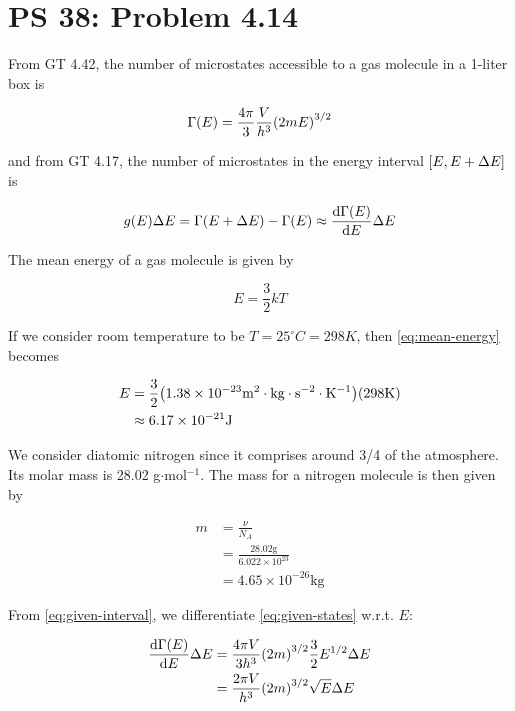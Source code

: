 \documentclass[12pt,a4paper]{article}
\begin{document}
\setcounter{page}{1}

\section*{PS 38: Problem 4.14}
\bigskip

From GT 4.42, the number of microstates accessible to a gas molecule in a 1-liter box is

\begin{equation}
	\Gamma(E) = \frac{4\pi}{3}\frac{V}{h^3}\qty(2mE)^{3/2} \label{eq:given-states}
\end{equation}

and from GT 4.17, the number of microstates in the energy interval $\qty[E, E+\Delta E]$ is

\begin{equation}
	g(E)\Delta E = \Gamma(E+\Delta E) - \Gamma(E) \approx \dv{\Gamma(E)}{E}\Delta E \label{eq:given-interval}
\end{equation}

The mean energy of a gas molecule is given by

\begin{equation}
	E = \frac{3}{2}kT \label{eq:mean-energy}
\end{equation}

If we consider room temperature to be $T = 25^\circ C = 298 K$, then \eqref{eq:mean-energy} becomes

\begin{align}
	E &= \frac{3}{2}\qty(1.38\times 10^{-23} \mathrm{m^2\cdot kg\cdot s^{-2}\cdot K^{-1}})\qty(298 \mathrm{K}) \nonumber \\
	&\approx 6.17\times 10^{-21} \mathrm{J} \label{eq:answer-energy}
\end{align}

We consider diatomic nitrogen since it comprises around 3/4 of the atmosphere. Its molar mass is 28.02 g$\cdot$mol$^{-1}$. The mass for a nitrogen molecule is then given by

\begin{align}
	m &= \frac{\nu}{N_A} \nonumber \\
	&= \frac{28.02\mathrm{g}}{6.022\times 10^{23}} \nonumber \\
	&= 4.65\times 10^{-26} \mathrm{kg} \label{eq:answer-mass}
\end{align}

From \eqref{eq:given-interval}, we differentiate \eqref{eq:given-states} w.r.t. $E$:

\begin{align}
	\dv{\Gamma(E)}{E}\Delta E &= \frac{4\pi V}{3h^3}\qty(2m)^{3/2} \frac{3}{2}E^{1/2} \Delta E \nonumber \\
	&= \frac{2\pi V}{h^3}\qty(2m)^{3/2}\sqrt{E}\Delta E \nonumber
\end{align}
\end{document}
